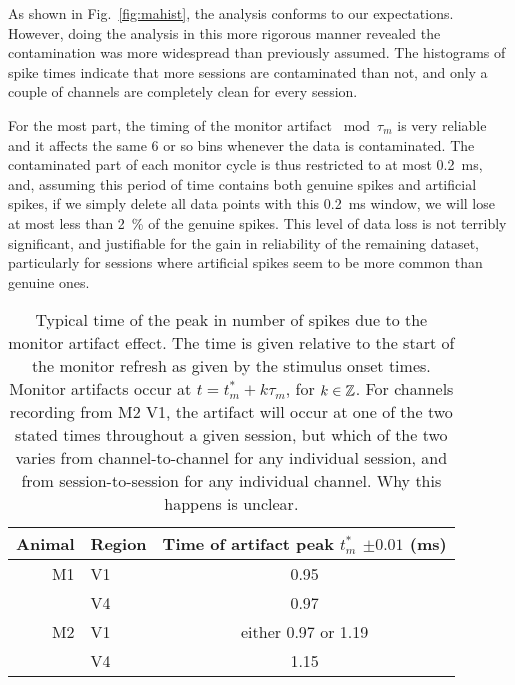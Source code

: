 
As shown in Fig.~\ref{fig:mahist}, the analysis conforms to our expectations.
However, doing the analysis in this more rigorous manner revealed the contamination was more widespread than previously assumed.
The histograms of spike times indicate that more sessions are contaminated than not, and only a couple of channels are completely clean for every session.

For the most part, the timing of the monitor artifact $\bmod \tau_m$ is very reliable and it affects the same 6 or so bins whenever the data is contaminated.
The contaminated part of each monitor cycle is thus restricted to at most \SI{0.2}{ms}, and, assuming this period of time contains both genuine spikes and artificial spikes, if we simply delete all data points with this \SI{0.2}{ms} window, we will lose at most less than \SI{2}{\percent} of the genuine spikes.
This level of data loss is not terribly significant, and justifiable for the gain in reliability of the remaining dataset, particularly for sessions where artificial spikes seem to be more common than genuine ones.

\begin{table}[hbtp]
\caption{Typical time of the peak in number of spikes due to the monitor artifact effect.
The time is given relative to the start of the monitor refresh as given by the stimulus onset times.
Monitor artifacts occur at $t = t^*_m + k \tau_m$, for $k \in \mathbb{Z}$.
For channels recording from \ac{M2} \ac{V1}, the artifact will occur at one of the two stated times throughout a given session, but which of the two varies from channel-to-channel for any individual session, and from session-to-session for any individual channel.
Why this happens is unclear.}
\label{tab:mapeak}
\begin{center}
\begin{tabular}{rlc}
\toprule
Animal  & Region & Time of artifact peak $t^*_m$ $\pm 0.01$ (\si{\milli\second})
\\
\midrule
M1  & V1    & 0.95
\\
        & V4    & 0.97
\\
M2    & V1    & either 0.97 or 1.19
\\
        & V4    & 1.15
\\
\bottomrule
\end{tabular}
\end{center}
\end{table}


